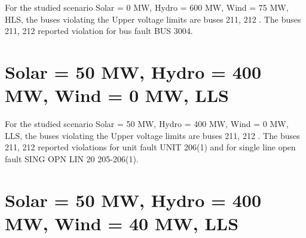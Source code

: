 \documentclass[10pt]{report}
\begin{document}
For the studied scenario Solar = 0 MW, Hydro = 600 MW, Wind = 75 MW, HLS, the buses violating the Upper voltage limits are buses 211, 212 .
The buses 211, 212 reported violation for bus fault BUS 3004.
\begin{table}[H]
\caption{Contingencies reporting bus voltages greater than emergency voltage of 1.1 PU for scenario Solar = 0 MW, Hydro = 600 MW, Wind = 75 MW, HLS}
\label{HVSolar0MWHydro600MWWind75MWHLS}
\centering
{}
\end{table}

\section{Solar = 50 MW, Hydro = 400 MW, Wind = 0 MW, LLS}

For the studied scenario Solar = 50 MW, Hydro = 400 MW, Wind = 0 MW, LLS, the buses violating the Upper voltage limits are buses 211, 212 .
The buses 211, 212 reported violations for unit fault UNIT 206(1) and for single line open fault SING OPN LIN   20 205-206(1).
\begin{table}[H]
\caption{Contingencies reporting bus voltages greater than emergency voltage of 1.1 PU for scenario Solar = 50 MW, Hydro = 400 MW, Wind = 0 MW, LLS}
\label{HVSolar50MWHydro400MWWind0MWLLS}
\centering
{}
\end{table}

\section{Solar = 50 MW, Hydro = 400 MW, Wind = 40 MW, LLS}
\end{document}
